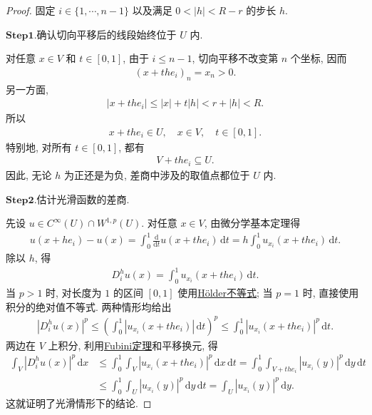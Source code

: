 \documentclass[../../main.tex]{subfiles}
\begin{document}
\begin{proof}
固定 $i\in\{1,\cdots,n-1\}$ 以及满足 $0<|h|<R-r$ 的步长 $h$.

\noindent$\mathbf{Step}\bm{1}$.{\heiti 确认切向平移后的线段始终位于 $U$ 内.}

对任意 $x\in V$ 和 $t\in[0,1]$, 由于 $i\leqslant n-1$, 切向平移不改变第 $n$ 个坐标, 因而
\begin{align*}
(x+the_i)_n=x_n>0.
\end{align*}
另一方面,
\begin{align*}
|x+the_i|
\leqslant |x|+t|h|
<r+|h|
<R.
\end{align*}
所以
\begin{align*}
x+the_i\in U,\quad
x\in V,\quad t\in[0,1].
\end{align*}
特别地, 对所有 $t\in[0,1]$, 都有
\begin{align*}
V+the_i\subseteq U.
\end{align*}
因此, 无论 $h$ 为正还是为负, 差商中涉及的取值点都位于 $U$ 内.

\noindent$\mathbf{Step}\bm{2}$.{\heiti 估计光滑函数的差商.}

先设 $u\in C^\infty(U)\cap W^{1,p}(U)$. 对任意 $x\in V$, 由微分学基本定理得
\begin{align*}
u(x+he_i)-u(x)
=\int_0^1\frac{\mathrm{d}}{\mathrm{d}t}u(x+the_i)\,\mathrm{d}t
=h\int_0^1u_{x_i}(x+the_i)\,\mathrm{d}t.
\end{align*}
除以 $h$, 得
\begin{align*}
D_i^h u(x)
=\int_0^1u_{x_i}(x+the_i)\,\mathrm{d}t.
\end{align*}
当 $p>1$ 时, 对长度为 $1$ 的区间 $[0,1]$ 使用\hyperref[Real Analysis-theorem:实变函数--Hölder不等式]{Hölder不等式}; 当 $p=1$ 时, 直接使用积分的绝对值不等式. 两种情形均给出
\begin{align*}
|D_i^h u(x)|^p
\leqslant
\left(\int_0^1|u_{x_i}(x+the_i)|\,\mathrm{d}t\right)^p
\leqslant
\int_0^1|u_{x_i}(x+the_i)|^p\,\mathrm{d}t.
\end{align*}
两边在 $V$ 上积分, 利用\hyperref[Real Analysis-theorem:实变函数-Fubini定理]{Fubini定理}和平移换元, 得
\begin{align}
\int_V|D_i^h u(x)|^p\,\mathrm{d}x
&\leqslant
\int_0^1\int_V|u_{x_i}(x+the_i)|^p\,\mathrm{d}x\,\mathrm{d}t=
\int_0^1\int_{V+the_i}|u_{x_i}(y)|^p\,\mathrm{d}y\,\mathrm{d}t\nonumber\\
&\leqslant
\int_0^1\int_U|u_{x_i}(y)|^p\,\mathrm{d}y\,\mathrm{d}t
=
\int_U|u_{x_i}(y)|^p\,\mathrm{d}y.\label{eq::NKZNJIOIJaaaaa}
\end{align}
这就证明了光滑情形下的结论.


\end{proof}
\end{document}
